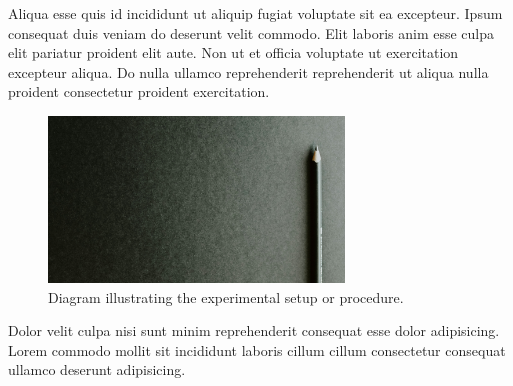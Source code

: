 Aliqua esse quis id incididunt ut aliquip fugiat voluptate sit ea excepteur. Ipsum consequat duis veniam do deserunt velit commodo. Elit laboris anim esse culpa elit pariatur proident elit aute. Non ut et officia voluptate ut exercitation excepteur aliqua. Do nulla ullamco reprehenderit reprehenderit ut aliqua nulla proident consectetur proident exercitation.

\begin{figure}[ht]
  \centering
  \includegraphics[width=0.7\textwidth]{figures/placeholder-figure.jpg}
  \caption{Diagram illustrating the experimental setup or procedure.}
  \label{fig:experimental_setup}
\end{figure}

Dolor velit culpa nisi sunt minim reprehenderit consequat esse dolor adipisicing. Lorem commodo mollit sit incididunt laboris cillum cillum consectetur consequat ullamco deserunt adipisicing.